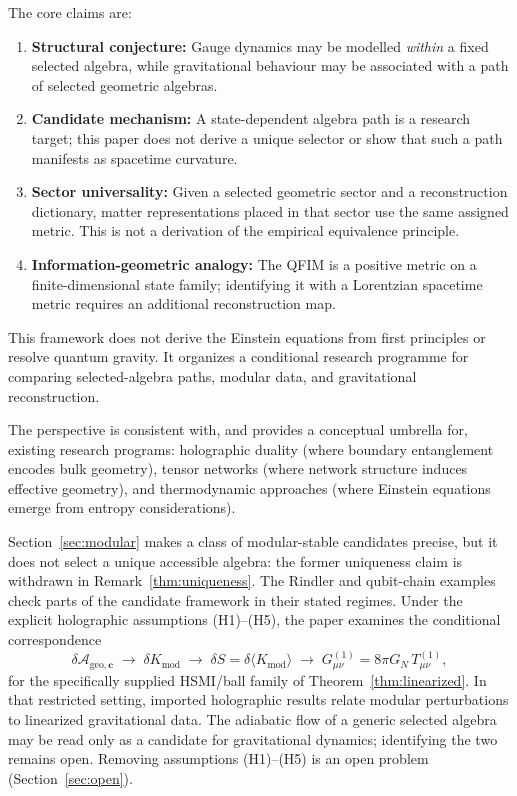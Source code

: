 \documentclass[12pt,a4paper]{article}
\begin{document}
The core claims are:
\begin{enumerate}
    \item \textbf{Structural conjecture:} Gauge dynamics may be modelled \emph{within} a fixed selected algebra, while gravitational behaviour may be associated with a path of selected geometric algebras.
    
    \item \textbf{Candidate mechanism:} A state-dependent algebra path is a research target; this paper does not derive a unique selector or show that such a path manifests as spacetime curvature.
    
    \item \textbf{Sector universality:} Given a selected geometric sector and a reconstruction dictionary, matter representations placed in that sector use the same assigned metric. This is not a derivation of the empirical equivalence principle.
    
    \item \textbf{Information-geometric analogy:} The QFIM is a positive metric on a finite-dimensional state family; identifying it with a Lorentzian spacetime metric requires an additional reconstruction map.
\end{enumerate}

This framework does not derive the Einstein equations from first principles or resolve quantum gravity. It organizes a conditional research programme for comparing selected-algebra paths, modular data, and gravitational reconstruction.

The perspective is consistent with, and provides a conceptual umbrella for, existing research programs: holographic duality (where boundary entanglement encodes bulk geometry), tensor networks (where network structure induces effective geometry), and thermodynamic approaches (where Einstein equations emerge from entropy considerations).

Section~\ref{sec:modular} makes a class of modular-stable candidates precise, but it does not select a unique accessible algebra: the former uniqueness claim is withdrawn in Remark~\ref{thm:uniqueness}. The Rindler and qubit-chain examples check parts of the candidate framework in their stated regimes. Under the explicit holographic assumptions (H1)--(H5), the paper examines the conditional correspondence
\begin{equation}
\delta\mathcal{A}_{\mathrm{geo},\mathbf{c}} \;\longrightarrow\; \delta K_{\mathrm{mod}} \;\longrightarrow\; \delta S = \delta\langle K_{\mathrm{mod}}\rangle \;\longrightarrow\; G_{\mu\nu}^{(1)} = 8\pi G_N\, T_{\mu\nu}^{(1)},
\end{equation}
for the specifically supplied HSMI/ball family of Theorem~\ref{thm:linearized}. In that restricted setting, imported holographic results relate modular perturbations to linearized gravitational data. The adiabatic flow of a generic selected algebra may be read only as a candidate for gravitational dynamics; identifying the two remains open. Removing assumptions (H1)--(H5) is an open problem (Section~\ref{sec:open}).
\end{document}
